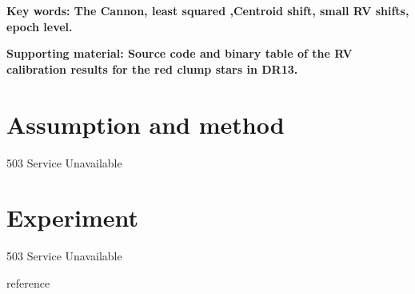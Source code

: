\documentclass[11pt, oneside]{article}   	%
\begin{document}
\begin{flushleft}
{\large \bf Key words: The Cannon, least squared ,Centroid shift, small RV shifts, epoch level.}
\end{flushleft}

\begin{flushleft}
{\large \bf Supporting material: Source code and binary table of the RV calibration results for the red clump stars in DR13.}
\end{flushleft}




 
 

 
 \section{\label{sec:level1}Assumption and method}
 
503 Service Unavailable
 



 
 \section{\label{sec:level1}Experiment}
 
503 Service Unavailable
 


\bigskip 



{\huge \bf

\begin{center}
reference
\end{center}
}



 
\end{document}
